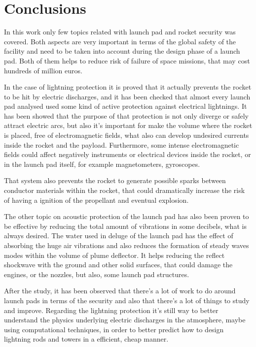 \section{Conclusions}

In this work only few topics related with launch pad and rocket security was covered.
Both aspects are very important in terms of the global safety of the facility and
need to be taken into account during the design phase of a launch pad. Both of them
helps to reduce risk of failure of space missions, that may cost hundreds of million
euros.

In the case of lightning protection it is proved that it actually prevents the
rocket to be hit by electric discharges, and it has been checked that almost
every launch pad analysed used some kind of active protection against electrical
lightnings. It has been showed that the purpose of that protection is not only
diverge or safely attract electric arcs, but also it's important for make the
volume where the rocket is placed, free of electromagnetic fields, what also can
develop undesired currents inside the rocket and the payload. Furthermore,
some intense electromagnetic fields could affect negatively instruments or electrical
devices inside the rocket, or in the launch pad itself, for example magnetometers,
gyroscopes.

That system also prevents the rocket to generate possible sparks between conductor
materials within the rocket, that could dramatically increase the risk of having
a ignition of the propellant and eventual explosion.

The other topic on acoustic protection of the launch pad has also been proven to be
effective by reducing the total amount of vibrations in some decibels, what is
always desired. The water used in deluge of the launch pad has the effect of absorbing
the huge air vibrations and also reduces the formation of steady waves modes within
the volume of plume deflector. It helps reducing the reflect shockwave with the ground
and other solid surfaces, that could damage the engines, or the nozzles, but also,
some launch pad structures.

After the study, it has been observed that there's a lot of work to do around launch
pads in terms of the security and also that there's a lot of things to study and improve.
Regarding the lightning protection it's still way to better understand the physics
underlying electric discharges in the atmosphere, maybe using computational techniques,
in order to better predict how to design lightning rods and towers in a efficient,
cheap manner.
